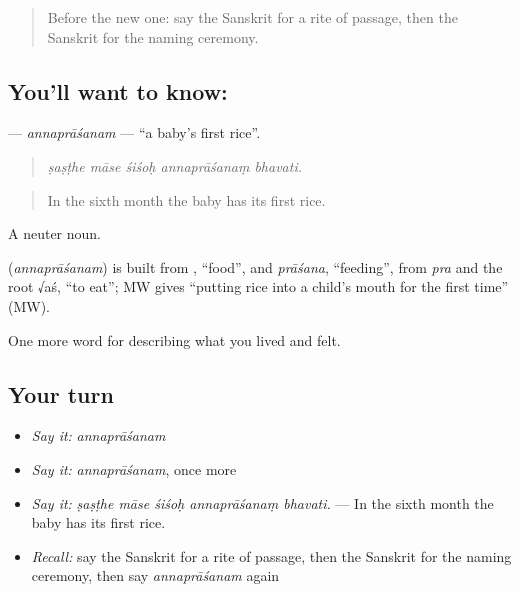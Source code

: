 \label{lesson:SA-C493-annaprasanam}



\begin{quote}
Before the new one: say the Sanskrit for a rite of passage, then the Sanskrit for the naming ceremony.
\end{quote}

\subsection*{You'll want to know: }
\textbf{} — \emph{annaprāśanam} — \textquotedblleft{}a baby's first rice\textquotedblright{}.

\begin{quote}
    
\end{quote}

\begin{quote}
\emph{ṣaṣṭhe māse śiśoḥ annaprāśanaṃ bhavati.}
\end{quote}

\begin{quote}
In the sixth month the baby has its first rice.
\end{quote}

A neuter noun.

\begin{cousinweb}
\textbf{} (\emph{annaprāśanam}) is built from \textbf{}, \textquotedblleft{}food\textquotedblright{}, and \emph{prāśana}, \textquotedblleft{}feeding\textquotedblright{}, from \emph{pra} and the root √aś, \textquotedblleft{}to eat\textquotedblright{}; MW gives \textquotedblleft{}putting rice into a child's mouth for the first time\textquotedblright{} (MW).
\end{cousinweb}

\begin{grammarlens}[title={What you've built}]
One more word for describing what you lived and felt.
\end{grammarlens}

\subsection*{Your turn}
\begin{itemize}
\raggedright
  \item \emph{Say it:} \emph{annaprāśanam}
  \item \emph{Say it:} \emph{annaprāśanam}, once more
  \item \emph{Say it:} \emph{ṣaṣṭhe māse śiśoḥ annaprāśanaṃ bhavati.} — In the sixth month the baby has its first rice.
  \item \emph{Recall:} say the Sanskrit for a rite of passage, then the Sanskrit for the naming ceremony, then say \emph{annaprāśanam} again
\end{itemize}

